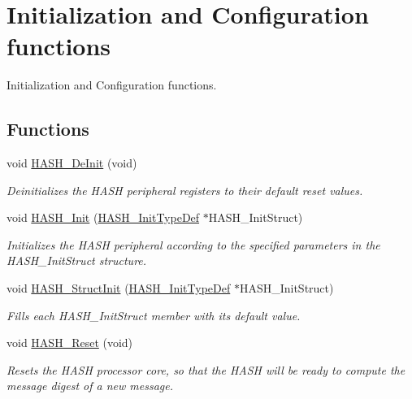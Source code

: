 \hypertarget{group___h_a_s_h___group1}{}\section{Initialization and Configuration functions}
\label{group___h_a_s_h___group1}


Initialization and Configuration functions.  


\subsection*{Functions}
\begin{DoxyCompactItemize}
\item 
void \hyperlink{group___h_a_s_h___group1_ga88717fe3a4f557182841a958e1dcd9c7}{H\+A\+S\+H\+\_\+\+De\+Init} (void)
\begin{DoxyCompactList}\small\item\em Deinitializes the H\+A\+S\+H peripheral registers to their default reset values. \end{DoxyCompactList}\item 
void \hyperlink{group___h_a_s_h___group1_ga4a7d33f0954ac0463a6cda81121635cf}{H\+A\+S\+H\+\_\+\+Init} (\hyperlink{struct_h_a_s_h___init_type_def}{H\+A\+S\+H\+\_\+\+Init\+Type\+Def} $\ast$H\+A\+S\+H\+\_\+\+Init\+Struct)
\begin{DoxyCompactList}\small\item\em Initializes the H\+A\+S\+H peripheral according to the specified parameters in the H\+A\+S\+H\+\_\+\+Init\+Struct structure. \end{DoxyCompactList}\item 
void \hyperlink{group___h_a_s_h___group1_ga9cfaaa73eafec40a06154f58d48adeb5}{H\+A\+S\+H\+\_\+\+Struct\+Init} (\hyperlink{struct_h_a_s_h___init_type_def}{H\+A\+S\+H\+\_\+\+Init\+Type\+Def} $\ast$H\+A\+S\+H\+\_\+\+Init\+Struct)
\begin{DoxyCompactList}\small\item\em Fills each H\+A\+S\+H\+\_\+\+Init\+Struct member with its default value. \end{DoxyCompactList}\item 
void \hyperlink{group___h_a_s_h___group1_ga11745813cf85a08b2058aac3bd026e4d}{H\+A\+S\+H\+\_\+\+Reset} (void)
\begin{DoxyCompactList}\small\item\em Resets the H\+A\+S\+H processor core, so that the H\+A\+S\+H will be ready to compute the message digest of a new message. \end{DoxyCompactList}\end{DoxyCompactItemize}


